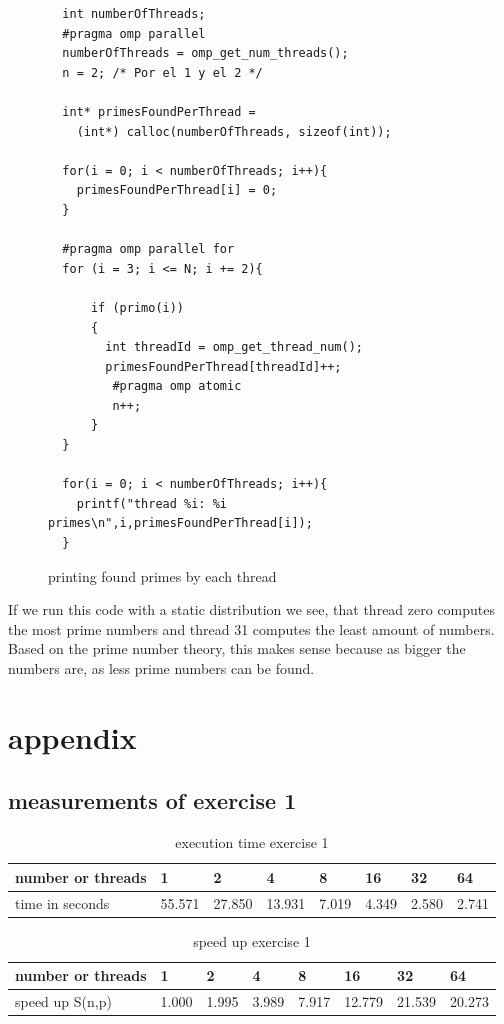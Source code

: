 \documentclass[11pt,a4paper]{article}
\begin{document}
\begin{figure}[h]
\label{code_printprimeseachthread}
\begin{lstlisting}
  int numberOfThreads;
  #pragma omp parallel
  numberOfThreads = omp_get_num_threads();
  n = 2; /* Por el 1 y el 2 */
  
  int* primesFoundPerThread = 
  	(int*) calloc(numberOfThreads, sizeof(int));
  	
  for(i = 0; i < numberOfThreads; i++){
    primesFoundPerThread[i] = 0;
  }
  
  #pragma omp parallel for
  for (i = 3; i <= N; i += 2){

      if (primo(i))
      {
        int threadId = omp_get_thread_num();
        primesFoundPerThread[threadId]++;
         #pragma omp atomic
         n++;
      }
  }
  
  for(i = 0; i < numberOfThreads; i++){
    printf("thread %i: %i primes\n",i,primesFoundPerThread[i]);
  }
\end{lstlisting} 
\caption{printing found primes by each thread}
\end{figure}

If we run this code with a static distribution we see, that thread zero computes the most prime numbers and thread 31 computes the least amount of numbers. Based on the prime number theory, this makes sense because as bigger the numbers are, as less prime numbers can be found.

\pagebreak

\section{appendix}

\subsection{measurements of exercise 1}

\begin{table}[h]
\centering
\label{measuresEx1}
\begin{tabular}{@{}l||l|l|l|l|l|l|l|@{}}
number or threads & 1      & 2      & 4      & 8     & 16    & 32    & 64    \\
\hline	
time in seconds   & 55.571 & 27.850 & 13.931 & 7.019 & 4.349 & 2.580 & 2.741
\end{tabular}
\caption{execution time exercise 1}
\end{table}

\begin{table}[h]
\centering
\label{measuresSpeedUpEx1}
\begin{tabular}{@{}l||l|l|l|l|l|l|l|@{}}
number or threads & 1      & 2      & 4      & 8     & 16    & 32    & 64    \\
\hline	
speed up S(n,p)   & 1.000 & 1.995 & 3.989 & 7.917 & 12.779 & 21.539 & 20.273
\end{tabular}
\caption{speed up exercise 1}
\end{table}
\end{document}

